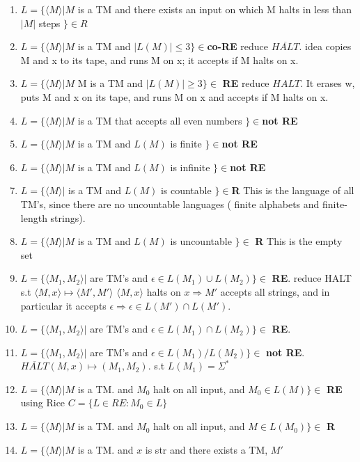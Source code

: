 \documentclass[10pt,landscape]{article}
\theoremstyle{plain}%
\theoremstyle{definition}
\theoremstyle{remark}
\begin{document}
\begin{multicols}{3}
\begin{enumerate}
\item $ L=\{ \langle M\rangle | M $ is a TM and there exists an input on which M halts in less than $|M|$ steps $\}\in R$
\item $ L=\{ \langle M\rangle | M $ is a TM and $|L(M)|\le 3 \}\in $\textbf{co-RE} reduce $\overline{HALT}$. idea copies M and x to its tape, and runs M on x; it accepts if M halts on x.
\item $ L=\{ \langle M\rangle | M $ M is a TM and $|L(M)|\ge 3 \}\in $\textbf{ RE} reduce $HALT$. It erases w, puts M and x on its tape, and runs M on x and accepts if M halts
on x.
\item $ L=\{ \langle M\rangle | M $ is a TM that accepts all even numbers $\}\in $\textbf{not RE}
\item $ L=\{ \langle M\rangle | M $ is a TM and $L(M)$ is finite $\}\in $\textbf{not RE}
\item $ L=\{ \langle M\rangle | M $ is a TM and $L(M)$ is infinite $\}\in $\textbf{not RE}
\item $ L=\{ \langle M\rangle |  $ is a TM and $ L(M)$ is  countable $\}\in $\textbf{R} This is the language of all TM’s, since there are no uncountable languages ( finite
alphabets and finite-length strings).
\item $ L=\{ \langle M\rangle | M $ is a TM and $ L(M)$ is  uncountable $\}\in $\textbf{ R}  This is the empty set
\item $L=\{ \langle M_1,M_2\rangle | $ are TM's and $\epsilon\in  L(M_1)\cup L(M_2)\}\in $ \textbf{RE}. reduce HALT s.t $ \langle M,x \rangle \mapsto \langle M',M' \rangle$ $ \langle M,x\rangle$ halts on $x \Rightarrow M'$
accepts all strings, and in particular it accepts $\epsilon \Rightarrow \epsilon \in L(M')\cap L(M')$.
\item $L=\{ \langle M_1,M_2\rangle |  $ are TM's and $\epsilon\in  L(M_1)\cap L(M_2)\}\in $ \textbf{RE}.
\item $L=\{ \langle M_1,M_2\rangle |  $ are TM's and $\epsilon\in  L(M_1)/ L(M_2)\}\in $ \textbf{not RE}.\\$\overline{HALT}(M,x)\mapsto(M_1,M_2).$ s.t $L(M_1)=\Sigma^*$
\item $ L=\{ \langle M\rangle | M $ is a TM. and $M_0$ halt on all input, and $M_0\in L(M) \}\in $\textbf{ RE} using Rice $C=\{L\in RE :M_0 \in L\}$
\item $ L=\{ \langle M\rangle | M $ is a TM. and $M_0$ halt on all input, and $M\in L(M_0) \}\in $\textbf{ R}
\item $ L=\{ \langle M\rangle | M $ is a TM. and $x$ is str and there exists a TM, $M'$

\end{enumerate}
\end{multicols}
\end{document}
